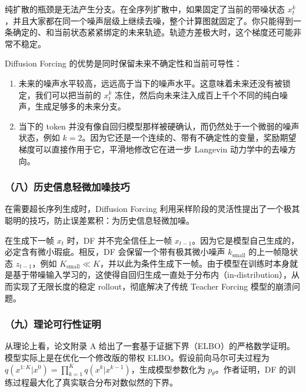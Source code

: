 纯扩散的瓶颈是无法产生分支。在全序列扩散中，如果固定了当前的带噪状态 \(x_t^k\)，并且大家都在同一个噪声层级上继续去噪，整个计算图就固定了。你只能得到一条确定的、和当前状态紧紧绑定的未来轨迹。轨迹方差极大时，这个梯度还可能非常不稳定。

Diffusion Forcing 的优势是同时保留未来不确定性和当前可导性：

\begin{enumerate}
\def\labelenumi{\arabic{enumi}.}
\tightlist
\item
  未来的噪声水平较高，远远高于当下的噪声水平。这意味着未来还没有被锁定，我们可以把当前的 \(x_t^k\) 冻住，然后向未来注入成百上千个不同的纯白噪声，生成足够多的未来分支。
\item
  当下的 token 并没有像自回归模型那样被硬确认，而仍然处于一个微弱的噪声状态，例如 \(k=2\)。因为它还是一个连续的、带有不确定性的变量，奖励期望梯度可以直接作用于它，平滑地修改它在进一步 Langevin 动力学中的去噪方向。
\end{enumerate}

\hypertarget{ux516bux5386ux53f2ux4fe1ux606fux8f7bux5faeux52a0ux566aux6280ux5de7}{%
\subsubsection{（八）历史信息轻微加噪技巧}\label{ux516bux5386ux53f2ux4fe1ux606fux8f7bux5faeux52a0ux566aux6280ux5de7}}

在需要超长序列生成时，Diffusion Forcing 利用采样阶段的灵活性提出了一个极其聪明的技巧，防止误差累积：为历史信息轻微加噪。

在生成下一帧 \(x_t\) 时，DF 并不完全信任上一帧 \(x_{t-1}\)。因为它是模型自己生成的，必定含有微小瑕疵。相反，DF 会保留一个带有极其微小噪声 \(k_{\mathrm{small}}\) 的上一帧隐状态 \(z_{t-1}\)，例如 \(K_{\mathrm{small}}\ll K\)，并以此为条件生成下一帧。由于模型在训练时本身就是基于带噪输入学习的，这使得自回归生成一直处于分布内（in-distribution），从而实现了无限长度的稳定 rollout，彻底解决了传统 Teacher Forcing 模型的崩溃问题。

\hypertarget{ux4e5dux7406ux8bbaux53efux884cux6027ux8bc1ux660e}{%
\subsubsection{（九）理论可行性证明}\label{ux4e5dux7406ux8bbaux53efux884cux6027ux8bc1ux660e}}

从理论上看，论文附录 A 给出了一套基于证据下界（ELBO）的严格数学证明。模型实际上是在优化一个修改版的带权 ELBO。假设前向马尔可夫过程为 \(q(x^{1:K}|x^0)=\prod_{k=1}^K q(x^k|x^{k-1})\)，生成模型参数化为 \(p_\theta\)。作者证明，DF 的训练过程最大化了真实联合分布对数似然的下界。


